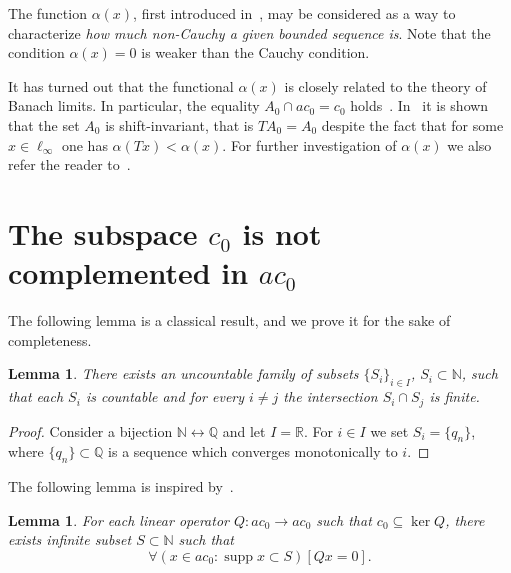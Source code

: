 \documentclass[a4paper,10pt]{article} %
\DeclareMathOperator{\supp}{supp}
\theoremstyle{plain}
\newtheorem{lemma}[theorem]{Lemma}
\theoremstyle{definition}
\begin{document}
The function $\alpha(x)$, first introduced in~\cite{our-vzms-2018},
may be considered as a way to characterize \emph{how much non-Cauchy a given bounded sequence is}.
Note that the condition $\alpha(x) =0$ is weaker than the Cauchy condition.

It has turned out that the functional $\alpha(x)$ is closely related to the theory of Banach limits.
In particular, the equality $A_0\cap ac_0 = c_0$ holds~\cite{avdeev2019space}.
In~\cite{our-ped-2018-alpha-Tx} it is shown that the set $A_0$ is shift-invariant, that is
$TA_0 = A_0$ despite the fact that for some $x\in\ell_\infty$
one has $\alpha(Tx)<\alpha(x)$.
For further investigation of $\alpha(x)$ we also refer the reader to~\cite{avdeev2021subsets}.

\section{The subspace $c_0$ is not complemented in $ac_0$}
\label{sec:c0_in_ac0}

The following lemma is a classical result, and we prove it for the sake of completeness.
\begin{lemma}
	\label{lem:uncountable_subsets_of_N_with_finite_intersections}
	There exists an uncountable family of subsets
	$\{S_i\}_{i\in I}$, $S_i \subset \mathbb{N}$,
	such that each $S_i$ is countable and for every $i\neq j$ the intersection $S_i \cap S_j$ is finite.
\end{lemma}

\begin{proof}
	Consider a bijection $\mathbb{N} \leftrightarrow \mathbb{Q}$
	and let $I = \mathbb{R}$.
	For $i\in I$ we set $S_i = \{q_n\}$,
	where $\{q_n\} \subset \mathbb{Q}$ is a sequence which converges monotonically to $i$.
\end{proof}








The following lemma is inspired by~\cite{mathSE_Phillips}.

\begin{lemma}
	\label{lem:c_0_not_complemented_in_ac_0}
	For each linear operator $Q: ac_0 \to ac_0$ such that $c_0\subseteq \ker Q$,
	there exists infinite subset $S \subset \mathbb{N}$ such that
	\begin{equation}
		\forall(x \in ac_0 : \supp x \subset S)[Qx = 0]
		.
	\end{equation}
\end{lemma}
\end{document}
